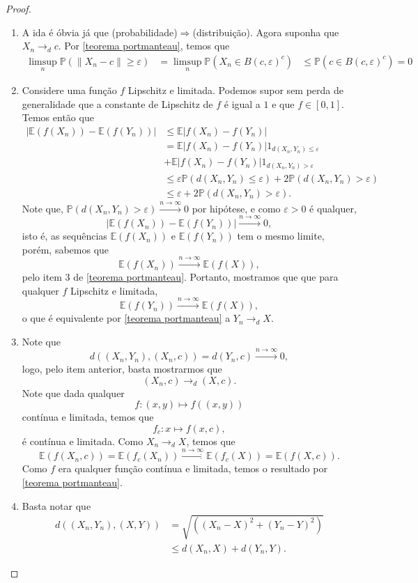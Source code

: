 \documentclass[12pt,a4paper,oneside]{book}
\theoremstyle{definition}
\theoremstyle{remark}
\numberwithin{equation}{section}
\newcommand{\e}{\varepsilon}
\newcommand{\E}{\mathbb{E}}
\newcommand{\pr}{\mathbb{P}}
\newcommand{\rarrowlimn}{\xrightarrow{n\rightarrow \infty}}
\begin{document}
\begin{proof}
$ $
\begin{enumerate}

\item A ida é óbvia já que  (probabilidade)$\Rightarrow$(distribuição). Agora suponha que $X_n \rightarrow_d c.$ Por \ref{teorema portmanteau}, temos que
\begin{align*}
\limsup_n \pr(\|X_n-c\| \geq  \e) &= \limsup_n  \pr(X_n \in B(c,\e)^c)
& \leq \pr(c\in B(c,\e)^c) = 0
\end{align*}

\item Considere uma função $f$ Lipschitz e limitada. Podemos supor sem perda de generalidade que a constante de Lipschitz de $f$ é igual a $1$ e que $f\in[0,1]$.
Temos então que
\begin{align*}
|\E(f(X_n)) - \E(f(Y_n))| & \leq \E|f(X_n) -f(Y_n)|\\
&  = \E|f(X_n) -f(Y_n)|1_{d(X_n,Y_n)\leq\e}\\
& +\E|f(X_n) -f(Y_n)|1_{d(X_n,Y_n)>\e}\\
& \leq \e \pr(d(X_n,Y_n)\leq \e) + 2 \pr(d(X_n,Y_n)> \e)\\
&\leq \e +  2 \pr(d(X_n,Y_n)> \e).
\end{align*}
Note que, $ \pr(d(X_n,Y_n)> \e) \rarrowlimn 0$ por hipótese, e como $\e>0$ é qualquer,
$$|\E(f(X_n)) - \E(f(Y_n))| \rarrowlimn 0, $$
isto é, as sequências $\E(f(X_n))$ e $\E(f(Y_n))$ tem o mesmo limite, porém, sabemos que
$$\E(f(X_n)) \rarrowlimn \E(f(X)), $$
pelo item 3 de \ref{teorema portmanteau}. Portanto, mostramos que que para qualquer $f$ Lipschitz e limitada,
 $$\E(f(Y_n)) \rarrowlimn \E(f(X)), $$
o que é equivalente por \ref{teorema portmanteau} a $Y_n \rightarrow_d X$.


\item Note que
$$d( (X_n,Y_n),(X_n,c)) = d(Y_n,c) \rarrowlimn 0, $$
logo, pelo item anterior, basta mostrarmos que
$$(X_n,c)\rightarrow_d (X,c). $$
Note que dada qualquer 
$$f:(x,y)\mapsto f((x,y))$$ contínua e limitada, temos que
$$f_c:x\mapsto f(x,c),$$
 é contínua e limitada. Como $X_n \rightarrow_d X$, temos que
 $$\E(f(X_n,c)) = \E(f_c(X_n)) \rarrowlimn \E(f_c(X))= \E(f(X,c)). $$
Como $f$ era qualquer função contínua e limitada, temos o resultado por \ref{teorema portmanteau}.


\item Basta notar que
\begin{align*}
d((X_n,Y_n),(X,Y)) &= \sqrt{((X_n-X)^2 + (Y_n-Y)^2 )}\\
&  \leq d(X_n,X) + d(Y_n,Y).  
\end{align*}

\end{enumerate}
\end{proof}
\end{document}
